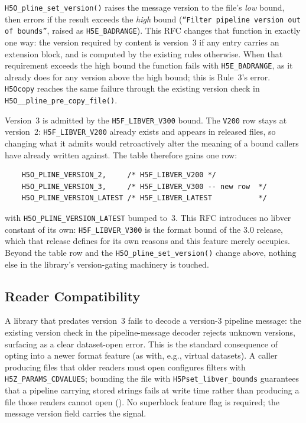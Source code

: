 \documentclass[../RFC-HDFG-2026-001.tex]{subfiles}
\begin{document}
\texttt{H5O\_pline\_set\_version()} raises the message version to the
file's \emph{low} bound, then errors if the result exceeds the \emph{high}
bound (\texttt{``Filter pipeline version out of bounds''}, raised as
\texttt{H5E\_BADRANGE}).  This RFC changes that function in exactly one
way: the version required by content is version~3 if any entry carries an
extension block, and is computed by the existing rules
otherwise.  When that requirement exceeds the high bound the function
fails with \texttt{H5E\_BADRANGE}, as it already does for any version
above the high bound; this is Rule~3's error.  \texttt{H5Ocopy} reaches
the same failure through the existing version check in
\texttt{H5O\_\_pline\_pre\_copy\_file()}.

Version~3 is admitted by the \texttt{H5F\_LIBVER\_V300} bound.  The
\texttt{V200} row stays at version~2: \texttt{H5F\_LIBVER\_V200} already
exists and appears in released files, so changing what it admits would
retroactively alter the meaning of a bound callers have already written
against.  The table therefore gains one row:

\begin{verbatim}
    H5O_PLINE_VERSION_2,     /* H5F_LIBVER_V200 */
    H5O_PLINE_VERSION_3,     /* H5F_LIBVER_V300 -- new row  */
    H5O_PLINE_VERSION_LATEST /* H5F_LIBVER_LATEST           */
\end{verbatim}

\noindent with \texttt{H5O\_PLINE\_VERSION\_LATEST} bumped to~3.  This
RFC introduces no libver constant of its own: \texttt{H5F\_LIBVER\_V300}
is the format bound of the 3.0 release, which that release defines for
its own reasons and this feature merely occupies.  Beyond the table row
and the \texttt{H5O\_pline\_set\_version()} change above, nothing else in
the library's version-gating machinery is touched.

\subsection{Reader Compatibility}
\label{sec:pline-v3-readers}

A library that predates version~3 fails to decode a version-3 pipeline
message: the existing version check in the pipeline-message decoder
rejects unknown versions, surfacing as a clear dataset-open error.  This
is the standard consequence of opting into a newer format feature (as
with, e.g., virtual datasets).  A caller producing files that older
readers must open configures filters with \texttt{H5Z\_PARAMS\_CDVALUES};
bounding the file with \texttt{H5Pset\_libver\_bounds} guarantees that a
pipeline carrying stored strings fails at write time rather than producing
a file those readers cannot open ().  No
superblock feature flag is required; the message
version field carries the signal.
\end{document}
